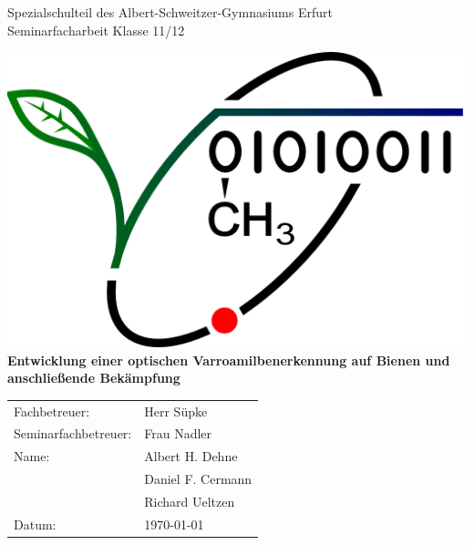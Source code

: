 \documentclass[11pt,a4paper]{article}
\begin{document}
\sloppy 			%

\begin{center}
\Large{Spezialschulteil des Albert-Schweitzer-Gymnasiums Erfurt}\\[1.5ex]
\large{Seminarfacharbeit Klasse 11/12}
\end{center}
\normalsize


\thispagestyle{empty}
\vspace*{2cm} %
\begin{center}
\includegraphics[scale=.4]{images/logo}\\
\vspace*{2cm}
\Huge{\textbf{Entwicklung einer optischen Varroamilbenerkennung auf Bienen und anschließende Bekämpfung}} 

\end{center}
\normalsize

\vspace*{4cm}
\Large{ %
\begin{tabular}{ll}
Fachbetreuer: & Herr Süpke \\
Seminarfachbetreuer: & Frau Nadler \\

Name: & Albert H. Dehne \\
& Daniel F. Cermann\\
& Richard Ueltzen\\

Datum: & \today
\end{tabular}
}
\normalsize %

\newpage

\thispagestyle{empty}
\setcounter{page}{1}
\tableofcontents
\newpage
\end{document}
